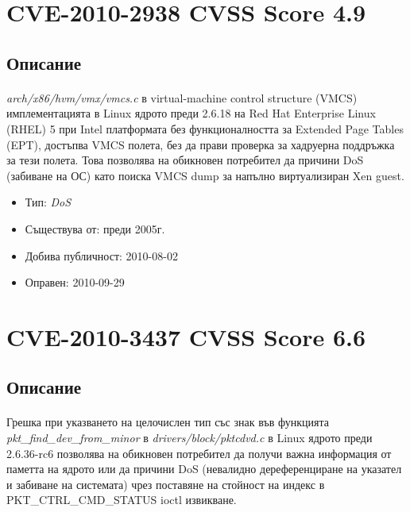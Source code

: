 \documentclass[a4paper,12pt,leqno]{article}
\begin{document}



\section{CVE-2010-2938 CVSS Score 4.9}
\subsection{Описание}
\paragraph{}
\textit{arch/x86/hvm/vmx/vmcs.c}  в virtual-machine control structure (VMCS) имплементацията в Linux ядрото преди 2.6.18 на Red Hat Enterprise Linux (RHEL) 5 при Intel платформата без функционалността за Extended Page Tables (EPT), достъпва VMCS полета, без да прави проверка за хадруерна поддръжка за тези полета. Това позволява на обикновен потребител да причини DoS (забиване на ОС) като поиска VMCS dump за напълно виртуализиран Xen guest.

\begin{itemize}
    \item Тип: \textit{DoS}
    \item Съществува от: преди 2005г.
  	\item Добива публичност: 2010-08-02
    \item Оправен: 2010-09-29
\end{itemize}

\section{CVE-2010-3437 CVSS Score 6.6}
\subsection{Описание}
\paragraph{}
Грешка при указването на целочислен тип със знак във функцията \\ \textit{pkt\_find\_dev\_from\_minor} в \textit{drivers/block/pktcdvd.c} в Linux ядрото преди 2.6.36-rc6 позволява на обикновен потребител да получи важна информация от паметта на ядрото или да причини DoS (невалидно дереференциране на указател и забиване на системата) чрез поставяне на стойност на индекс в \\ PKT\_CTRL\_CMD\_STATUS ioctl извикване.
\end{document}
